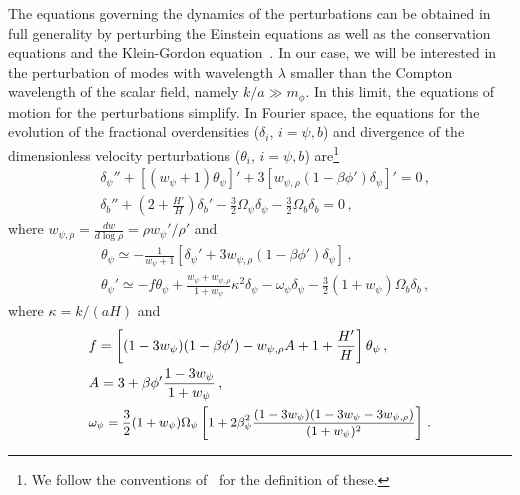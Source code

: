 \documentclass[a4paper, amsfonts, amssymb, amsmath, reprint, showkeys, nofootinbib, twoside, superscriptaddress]{revtex4-1}
\begin{document}
The equations governing the dynamics of the perturbations can be obtained in full generality by perturbing the Einstein equations as well as the conservation equations and the Klein-Gordon equation~\cite{Amendola:2003wa}. In our case, we will be interested in the perturbation of modes with wavelength $\lambda$ smaller than the Compton wavelength of the scalar field, namely $k/a \gg m_\phi$. In this limit, the equations of motion for the perturbations simplify. In Fourier space, the equations for the evolution of the fractional overdensities ($\delta_i$, $i=\psi, b$) and divergence of the dimensionless velocity perturbations ($\theta_i$, $i=\psi, b$) are\footnote{We follow the conventions of~\cite{Amendola:2003wa} for the definition of these.} 
%
\begin{align}
\label{eq:PerturbationDeltaPsi}
&\delta_\psi'' + \left[(w_\psi + 1) \theta_\psi\right]' + 3 \left[w_{\psi, \rho} (1-\beta \phi') \delta_\psi\right]' = 0 \,, \\
\label{eq:PerturbationDeltaB}
&\delta_b'' + \left(2 + \frac{H'}{H}\right) \delta_b' - \frac{3}{2} \Omega_\psi \delta_\psi - \frac{3}{2} \Omega_b \delta_b = 0 \,, 
\end{align}
where $w_{\psi, \rho} = \frac{d w}{d \log \rho} = \rho w_\psi'/\rho'$ and
\begin{align}
&\theta_\psi \simeq - \frac{1}{w_\psi+1} \left[\delta_\psi' + 3 w_{\psi, \rho} (1 - \beta \phi') \delta_\psi\right] \,, \nonumber\\
&\theta_\psi' \simeq - f \theta_\psi + \frac{w_\psi + w_{\psi, \rho}}{1 + w_\psi} \kappa^2 \delta_\psi - \omega_\psi \delta_\psi - \frac{3}{2} (1+w_\psi) \Omega_b \delta_b \,,\nonumber
\end{align}
where $\kappa = k/(a H)$ and
\begin{align}
& f = \left[(1-3 w_\psi)(1 - \beta \phi') - w_{\psi, \rho} A + 1 + \frac{H'}{H}\right] \theta_\psi \,, \nonumber\\
& A = 3 + \beta \phi' \frac{1-3w_\psi}{1+w_\psi} \,, \nonumber\\
&\text{\small $\omega_\psi = \frac{3}{2} (1+w_\psi) \Omega_\psi \left[1 + 2 \beta_\psi^2 \frac{(1-3w_\psi)(1-3w_\psi - 3 w_{\psi,\rho})}{(1+w_\psi)^2}\right] \,.$} \nonumber
\end{align}
%
\end{document}
